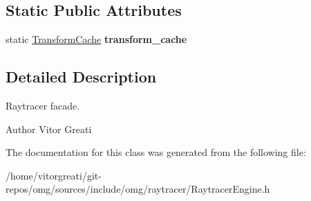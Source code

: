 \subsection*{Static Public Attributes}
\begin{DoxyCompactItemize}
\item 
\mbox{\label{classomg_1_1_raytracer_engine_a5235249f78867a5b0febed1a2de698c3}} 
static \mbox{\hyperlink{classomg_1_1_transform_cache}{Transform\+Cache}} {\bfseries transform\+\_\+cache}
\end{DoxyCompactItemize}


\subsection{Detailed Description}
Raytracer facade. 

\begin{DoxyAuthor}{Author}
Vitor Greati 
\end{DoxyAuthor}


The documentation for this class was generated from the following file\+:\begin{DoxyCompactItemize}
\item 
/home/vitorgreati/git-\/repos/omg/sources/include/omg/raytracer/Raytracer\+Engine.\+h\end{DoxyCompactItemize}
